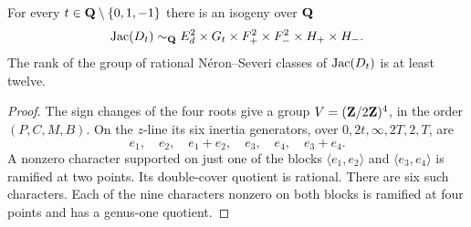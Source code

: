 \begin{theorem}\label{thm:nine-isogeny}
For every $t\in\mathbf Q\setminus\{0,1,-1\}$ there is an isogeny over $\mathbf Q$
\begin{equation}\label{eq:nine-isogeny}
 \operatorname{Jac}(D_t)\sim_{\mathbf Q}
 E_d^2\times G_t\times F_+^2\times F_-^2\times H_+\times H_-.
\end{equation}
The rank of the group of rational N\'eron--Severi classes of $\operatorname{Jac}(D_t)$
is at least twelve.
\end{theorem}
\begin{proof}
The sign changes of the four roots give a group
$V=(\mathbf Z/2\mathbf Z)^4$, in the order $(P,C,M,B)$.  On the $z$-line its six
inertia generators, over $0,2t,\infty,2T,2,T$, are
\[
 e_1,\quad e_2,\quad e_1+e_2,\quad
 e_3,\quad e_4,\quad e_3+e_4.
\]
A nonzero character supported on just one of the blocks
$\langle e_1,e_2\rangle$ and $\langle e_3,e_4\rangle$ is ramified at
two points.  Its double-cover quotient is rational.  There are six such
characters.  Each of the nine characters nonzero on both blocks is
ramified at four points and has a genus-one quotient.


\end{proof}

